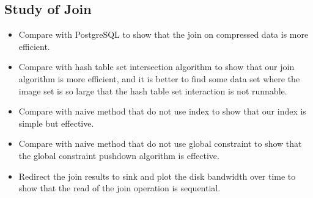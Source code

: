 \subsection{Study of Join}
\begin{itemize}[noitemsep]
\item Compare with PostgreSQL to show that the join on compressed data is more efficient.
\item Compare with hash table set intersection algorithm to show that our join algorithm is more efficient,
  and it is better to find some data set where the image set is so large that the hash table set interaction is not runnable.
\item Compare with naive method that do not use index to show that our index is simple but effective.
\item Compare with naive method that do not use global constraint to show that the global constraint pushdown algorithm is effective.
\item Redirect the join results to sink and plot the disk bandwidth over time to show that the read of the join operation is sequential.
\end{itemize}
